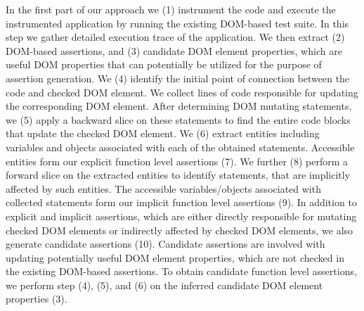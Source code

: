 In the first part of our approach we (1) instrument the \javascript code and execute the instrumented application by running the existing DOM-based test suite. In this step we gather detailed execution trace of the application. We then extract (2) DOM-based assertions, and (3) candidate DOM element properties, which are useful DOM properties that can potentially be utilized for the purpose of assertion generation. We (4) identify the initial point of connection between the \javascript code and checked DOM element. We collect lines of code responsible for updating the corresponding DOM element. After determining DOM mutating statements, we (5) apply a backward slice on these statements to find the entire code blocks that update the checked DOM element. We (6) extract \javascript entities including variables and objects associated with each of the obtained statements. Accessible entities form our explicit function level assertions (7). We further (8) perform a forward slice on the extracted \javascript entities to identify statements, that are implicitly affected by such entities. The accessible \javascript variables/objects associated with collected statements form our implicit function level assertions (9). In addition to explicit and implicit assertions, which are either directly responsible for mutating checked DOM elements or indirectly affected by checked DOM elements, we also generate candidate assertions (10). Candidate assertions are involved with updating potentially useful DOM element properties, which are not checked in the existing DOM-based assertions. To obtain candidate function level assertions, we perform step (4), (5), and (6) on the inferred candidate DOM element properties (3).


         
